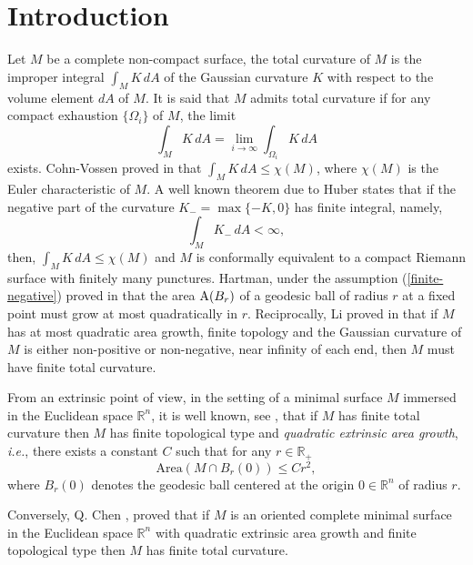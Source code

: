 \documentclass[a4paper]{amsart}
\theoremstyle{definition}
\numberwithin{equation}{section}
\begin{document}
\section{Introduction}
Let $M$ be a complete non-compact surface, the total curvature of $M$ is the improper integral $\int_M K\, dA$ of the Gaussian curvature $K$ with respect to the volume element $dA$ of $M$. It is said that $M$ admits total curvature if for any compact exhaustion $\{\Omega_i\}$ of $M$, the limit
$$
\int_M K\,dA=\lim_{i\to\infty}\int_{\Omega_i}K\,dA 
$$
exists. Cohn-Vossen proved in \cite{CV} that $\int_M K\, dA\leq \chi(M)$, where $\chi(M)$ is the Euler characteristic of $M$. A well known theorem due to Huber \cite{Hub} states that if the negative part of the curvature $K_{-}=\max\{-K,0\}$ has finite integral, namely,
\begin{equation}\label{finite-negative}
\int_MK_{-}\,dA<\infty,
\end{equation}then, $\int_M K\, dA\leq \chi(M)$ and $M$ is conformally equivalent to a compact Riemann surface with finitely many punctures. Hartman, under the assumption (\ref{finite-negative}) proved in \cite{Har} that the area ${\rm A}(B_r)$ of a geodesic ball of radius $r$ at a fixed point must grow at most quadratically in $r$. Reciprocally, Li proved in \cite{Li97} that if $M$ has at most quadratic area growth, finite topology and the Gaussian curvature of $M$ is either non-positive or non-negative, near infinity of each end, then $M$ must have finite total curvature.  

From an extrinsic point of view, in the setting of a minimal surface $M$ immersed in the Euclidean space ${\mathbb{R}}^n$, it is  well known, see \cite{Choss, JM,Oss1,Oss}, that  if $M$ has finite total curvature then $M$ has finite topological type and  \emph{quadratic extrinsic area growth}, \emph{i.e.}, there exists a constant $C$ such that for any $r\in {\mathbb{R}}_+$
\begin{equation}
\text{Area}(M\cap B_r(0))\leq C r^2,
\end{equation}
where $B_r(0)$ denotes the geodesic ball centered at the origin $0\in {\mathbb{R}}^n$ of radius $r$.

 Conversely, Q. Chen \cite{Ch1}, proved that if $M$ is an oriented complete  minimal surface in the Euclidean space ${\mathbb{R}}^n$ with quadratic extrinsic area growth and finite topological type then $M$ has finite total curvature.
\end{document}
